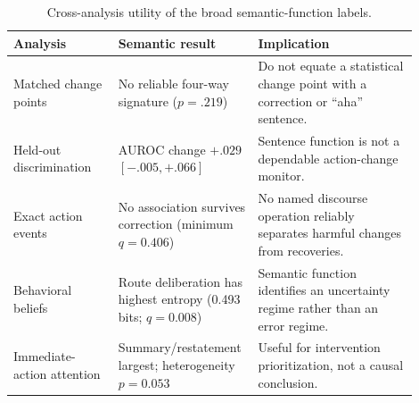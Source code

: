 \begin{table}[t]
\centering
\small
\begin{tabular}{p{0.25\linewidth}p{0.27\linewidth}p{0.38\linewidth}}
\toprule
Analysis & Semantic result & Implication \\
\midrule
Matched change points & No reliable four-way signature ($p=.219$) &
Do not equate a statistical change point with a correction or ``aha'' sentence. \\
Held-out discrimination & AUROC change $+.029$ $[-.005,+.066]$ &
Sentence function is not a dependable action-change monitor. \\
Exact action events & No association survives correction (minimum $q=0.406$) &
No named discourse operation reliably separates harmful changes from recoveries. \\
Behavioral beliefs & Route deliberation has highest entropy (0.493 bits; $q=0.008$) &
Semantic function identifies an uncertainty regime rather than an error regime. \\
Immediate-action attention & Summary/restatement largest; heterogeneity $p=0.053$ &
Useful for intervention prioritization, not a causal conclusion. \\
\bottomrule
\end{tabular}
\caption{Cross-analysis utility of the broad semantic-function labels.}
\label{tab:semantic_action_change_synthesis}
\end{table}
